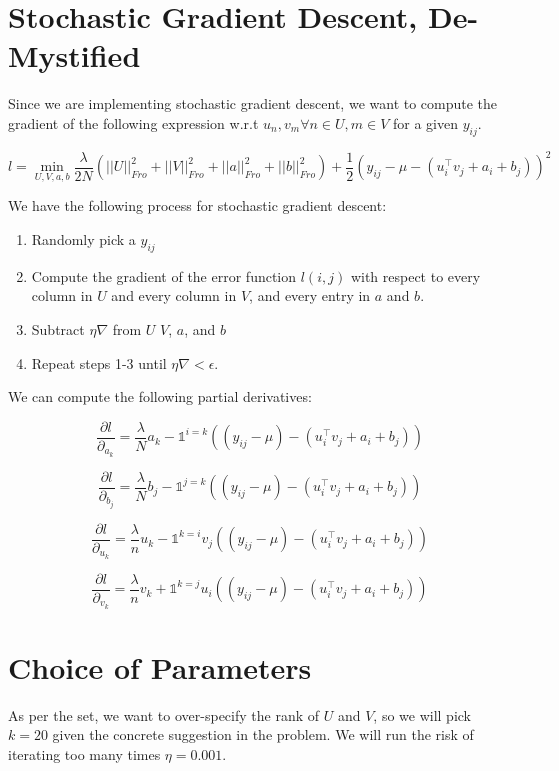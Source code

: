 \documentclass{article}
\begin{document}
\section*{Stochastic Gradient Descent, De-Mystified}

Since we are implementing stochastic gradient descent, we want to
compute the gradient of the following expression w.r.t $u_{n}, v_{m} \forall n \in U, m \in V$ for
a given $y_{ij}$.

$$ l =  \min_{U, V, a, b} \frac{\lambda}{2N} (||U||^{2}_{Fro} + ||V||^{2}_{Fro}
+ ||a||^{2}_{Fro} + ||b||^{2}_{Fro}) + \frac{1}{2} (y_{ij} - \mu - (u_{i}^{\intercal}v_{j} + a_{i} + b_{j}))^{2} $$

We have the following process for stochastic gradient descent:

\begin{enumerate}
    \item Randomly pick a $y_{ij}$
    \item Compute the gradient of the error function $l(i,j)$ with respect to every column
        in $U$ and every column in $V$, and every entry in $a$ and $b$.
    \item Subtract $\eta \nabla$ from $U$ $V$, $a$, and $b$
    \item Repeat steps 1-3 until $\eta \nabla < \epsilon$.
\end{enumerate}

We can compute the following partial derivatives:

$$ \frac{\partial l}{\partial_{a_{k}}} = \frac{\lambda}{N} a_{k} - \mathds{1}^{i = k}((y_{ij} - \mu) -
(u_{i}^{\intercal}v_{j} + a_{i} + b_{j})) $$

$$ \frac{\partial l}{\partial_{b_{j}}} = \frac{\lambda}{N} b_{j} - \mathds{1}^{j=k}((y_{ij} - \mu) -
(u_{i}^{\intercal}v_{j} + a_{i} + b_{j})) $$


$$ \frac{\partial l}{\partial_{u_{k}}} = \frac{\lambda}{n} u_{k} - \mathds{1}^{k = i} v_{j}((y_{ij} - \mu) -
(u_{i}^{\intercal}v_{j} + a_{i} + b_{j}))  $$

$$ \frac{\partial l}{\partial_{v_{k}}} = \frac{\lambda}{n} v_{k} + \mathds{1}^{k = j} u_{i}((y_{ij} - \mu) -
(u_{i}^{\intercal}v_{j} + a_{i} + b_{j})) $$

\section*{Choice of Parameters}
As per the set, we want to over-specify the rank of $U$ and $V$, so we will pick $k = 20$
given the concrete suggestion in the problem. We will run the risk of iterating too
many times $\eta = 0.001$.
\end{document}
